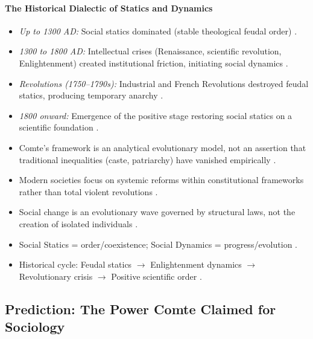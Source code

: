 \paragraph{The Historical Dialectic of Statics and Dynamics}
\begin{itemize}
    \item \textit{Up to 1300 AD:} Social statics dominated (stable theological feudal order) .
    \item \textit{1300 to 1800 AD:} Intellectual crises (Renaissance, scientific revolution, Enlightenment) created institutional friction, initiating social dynamics .
    \item \textit{Revolutions (1750--1790s):} Industrial and French Revolutions destroyed feudal statics, producing temporary anarchy .
    \item \textit{1800 onward:} Emergence of the positive stage restoring social statics on a scientific foundation .
\end{itemize}

\begin{CriticalPoint}
\begin{itemize}
    \item Comte's framework is an analytical evolutionary model, not an assertion that traditional inequalities (caste, patriarchy) have vanished empirically .
    \item Modern societies focus on systemic reforms within constitutional frameworks rather than total violent revolutions .
    \item Social change is an evolutionary wave governed by structural laws, not the creation of isolated individuals .
\end{itemize}
\end{CriticalPoint}

\begin{QuickRevision}
\begin{itemize}
    \item Social Statics = order/coexistence; Social Dynamics = progress/evolution .
    \item Historical cycle: Feudal statics $\rightarrow$ Enlightenment dynamics $\rightarrow$ Revolutionary crisis $\rightarrow$ Positive scientific order .
\end{itemize}
\end{QuickRevision}

\subsection{Prediction: The Power Comte Claimed for Sociology}

